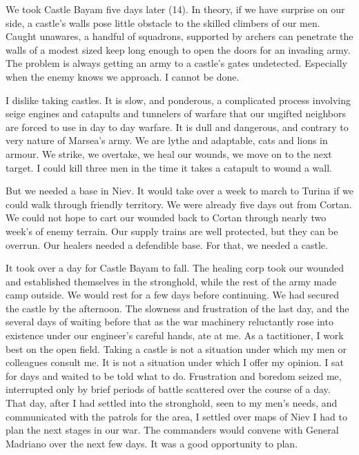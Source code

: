 \documentclass{article}
\begin{document}
We took Castle Bayam five days later (14). In theory, if we have surprise on our side, a castle's walls pose little obstacle to the skilled climbers of our men. Caught unawares, a handful of squadrons, supported by archers can penetrate the walls of a modest sized keep long enough to open the doors for an invading army. The problem is always getting an army to a castle's gates undetected. Especially when the enemy knows we approach. I cannot be done. 

I dislike taking castles. It is slow, and ponderous, a complicated process involving seige engines and catapults and tunnelers of warfare that our ungifted neighbors are forced to use in day to day warfare. It is dull and dangerous, and contrary to very nature of Marsea's army. We are lythe and adaptable, cats and lions in armour. We strike, we overtake, we heal our wounds, we move on to the next target. I could kill three men in the time it takes a catapult to wound a wall. 

But we needed a base in Niev. It would take over a week to march to Turina if we could walk through friendly territory. We were already five days out from Cortan. We could not hope to cart our wounded back to Cortan through nearly two week's of enemy terrain. Our supply trains are well protected, but they can be overrun. Our healers needed a defendible base. For that, we needed a castle.

It took over a day for Castle Bayam to fall. The healing corp took our wounded and established themselves in the stronghold, while the rest of the army made camp outside. We would rest for a few days before continuing. We had secured the castle by the afternoon. The slowness and frustration of the last day, and the several days of waiting before that as the war machinery reluctantly rose into existence under our engineer's careful hands, ate at me. As a tactitioner, I work best on the open field. Taking a castle is not a situation under which my men or colleagues consult me. It is not a situation under which I offer my opinion. I sat for days and waited to be told what to do. Frustration and boredom seized me, interrupted only by brief periods of battle scattered over the course of a day. That day, after I had settled into the stronghold, seen to my men's needs, and communicated with the patrols for the area, I settled over maps of Niev I had to plan the next stages in our war. The commanders would convene with General Madriano over the next few days. It was a good opportunity to plan. 
\end{document}
